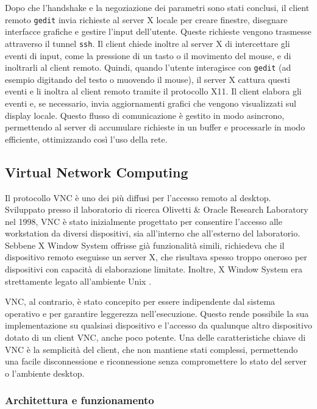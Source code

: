 \documentclass[12pt,a4paper,openright,twoside]{book}
\begin{document}
Dopo che l'handshake e la negoziazione dei parametri sono stati conclusi,
il client remoto \texttt{gedit} invia richieste al server X locale per creare finestre, disegnare interfacce grafiche e gestire l'input dell'utente.
%
Queste richieste vengono trasmesse attraverso il tunnel \texttt{ssh}.
%
Il client chiede inoltre al server X di intercettare gli eventi di input, come la pressione di un tasto o il movimento del mouse, e di inoltrarli al client remoto.
%
Quindi, quando l'utente interagisce con \texttt{gedit} (ad esempio digitando del testo o muovendo il mouse),
il server X cattura questi eventi e li inoltra al client remoto tramite il protocollo X11.
%
Il client elabora gli eventi e, se necessario, invia aggiornamenti grafici che vengono visualizzati sul display locale.
%
Questo flusso di comunicazione è gestito in modo asincrono, permettendo al server di accumulare richieste in un buffer e processarle in modo efficiente, ottimizzando così l'uso della rete.

\subsection{Virtual Network Computing}

Il protocollo \ac{VNC} è uno dei più diffusi per l'accesso remoto al desktop.
%
Sviluppato presso il laboratorio di ricerca Olivetti \& Oracle Research Laboratory nel 1998,
\ac{VNC} è stato inizialmente progettato per consentire l'accesso alle workstation da diversi dispositivi,
sia all'interno che all'esterno del laboratorio.
Sebbene X Window System offrisse già funzionalità simili, richiedeva che il dispositivo remoto eseguisse un server X,
che risultava spesso troppo oneroso per dispositivi con capacità di elaborazione limitate. Inoltre, X Window System era strettamente legato all'ambiente Unix \cite{richardson1998vnc}.

\ac{VNC}, al contrario, è stato concepito per essere indipendente dal sistema operativo e per garantire leggerezza nell'esecuzione.
Questo rende possibile la sua implementazione su qualsiasi dispositivo e l'accesso da qualunque altro dispositivo dotato di un client \ac{VNC},
anche poco potente.
%
Una delle caratteristiche chiave di \ac{VNC} è la semplicità del client, che non mantiene stati complessi,
permettendo una facile disconnessione e riconnessione senza compromettere lo stato del server o l'ambiente desktop.

\subsubsection{Architettura e funzionamento}
\end{document}
